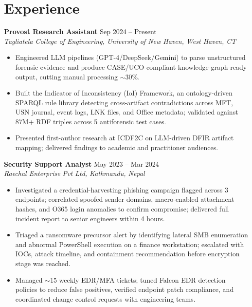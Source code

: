 \documentclass{resume2}
\begin{document}
\section{Experience}

\textbf{Provost Research Assistant} \hfill Sep 2024 -- Present\\
\textit{Tagliatela College of Engineering, University of New Haven, West Haven, CT}
\begin{itemize}[leftmargin=1.2em,itemsep=-2pt,topsep=2pt]
  \item Engineered LLM pipelines (GPT-4/DeepSeek/Gemini) to parse unstructured forensic evidence and produce CASE/UCO-compliant knowledge-graph-ready output, cutting manual processing $\sim$30\%.
  \item Built the Indicator of Inconsistency (IoI) Framework, an ontology-driven SPARQL rule library detecting cross-artifact contradictions across MFT, USN journal, event logs, LNK files, and Office metadata; validated against 87M+ RDF triples across 5 antiforensic test cases.
  \item Presented first-author research at ICDF2C on LLM-driven DFIR artifact mapping; delivered findings to academic and practitioner audiences.
\end{itemize}

\medskip
\textbf{Security Support Analyst} \hfill May 2023 -- Mar 2024\\
\textit{Raechal Enterprise Pvt Ltd, Kathmandu, Nepal}
\begin{itemize}[leftmargin=1.2em,itemsep=-2pt,topsep=2pt]
  \item Investigated a credential-harvesting phishing campaign flagged across 3 endpoints; correlated spoofed sender domains, macro-enabled attachment hashes, and O365 login anomalies to confirm compromise; delivered full incident report to senior engineers within 4 hours.
  \item Triaged a ransomware precursor alert by identifying lateral SMB enumeration and abnormal PowerShell execution on a finance workstation; escalated with IOCs, attack timeline, and containment recommendation before encryption stage was reached.
  \item Managed $\sim$15 weekly EDR/MFA tickets; tuned Falcon EDR detection policies to reduce false positives, verified endpoint patch compliance, and coordinated change control requests with engineering teams.
\end{itemize}

\end{document}

